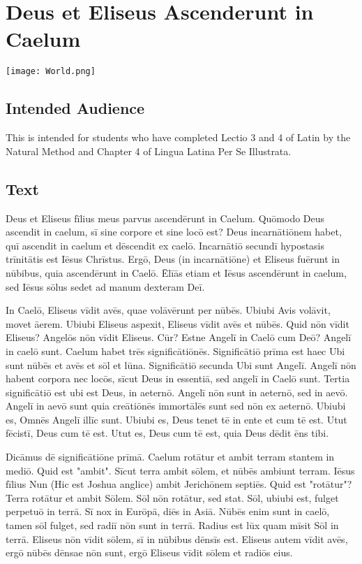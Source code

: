 \chapter{Deus et Eliseus Ascenderunt in Caelum}
\begin{center}
\texttt{[image: World.png]}
\end{center}

\section{Intended Audience}
This is intended for students who have completed Lectio 3 and 4 of Latin by the Natural Method and Chapter 4 of Lingua Latina Per Se Illustrata. 

\section{Text}
Deus et Eliseus fīlius meus parvus ascendērunt in Caelum. Quōmodo Deus ascendit in caelum, sī sine corpore et sine locō est? Deus incarnātiōnem habet, quī ascendit in caelum et dēscendit ex caelō. Incarnātiō secundī hypostasis trīnitātis est Iēsus Chrīstus. Ergō, Deus (in incarnātiōne) et Eliseus fuērunt in nūbibus, quia ascendērunt in Caelō. Ēlīās etiam et Iēsus ascendērunt in caelum, sed Iēsus sōlus sedet ad manum dexteram Deī. 

In Caelō, Eliseus vīdit avēs, quae volāvērunt per nūbēs. Ubiubi Avis volāvit, movet āerem. Ubiubi Eliseus aspexit, Eliseus vīdit avēs et nūbēs. Quid nōn vīdit Eliseus? Angelōs nōn vīdit Eliseus. Cūr? Estne Angelī in Caelō cum Deō?  Angelī in caelō sunt. Caelum habet trēs significātiōnēs. Significātiō prīma est haec \: Ubi sunt nūbēs et avēs et sōl et lūna. Significātiō secunda \: Ubi sunt Angelī. Angelī nōn habent corpora nec locōs, sīcut Deus in essentiā, sed angelī in Caelō sunt. Tertia significātiō est ubi est Deus, in aeternō. Angelī nōn sunt in aeternō, sed in aevō. Angelī in aevō sunt quia creātiōnēs immortālēs sunt sed nōn ex aeternō. Ubiubi es, Omnēs Angelī illīc sunt. Ubiubi es, Deus tenet tē in ente et cum tē est. Utut fēcistī, Deus cum tē est. Utut es, Deus cum tē est, quia Deus dēdit ēns tibi. 

Dicāmus dē significātiōne prīmā. Caelum rotātur et ambit terram stantem in mediō. Quid est "ambit". Sīcut terra ambit sōlem, et nūbēs ambiunt terram. Iēsus fīlius Nun (Hic est Joshua anglice) ambit Jerichōnem septiēs. Quid est "rotātur"? Terra rotātur et ambit Sōlem. Sōl nōn rotātur, sed stat. Sōl, ubiubi est, fulget perpetuō in terrā. Sī nox in Eurōpā, diēs in Asiā. Nūbēs enim sunt in caelō, tamen sōl fulget, sed radiī nōn sunt in terrā. Radius est lūx quam mīsit Sōl in terrā. Eliseus nōn vīdit sōlem, sī in nūbibus dēnsīs est. Eliseus autem vīdit avēs, ergō nūbēs dēnsae nōn sunt, ergō Eliseus vīdit sōlem et radiōs eius. 

